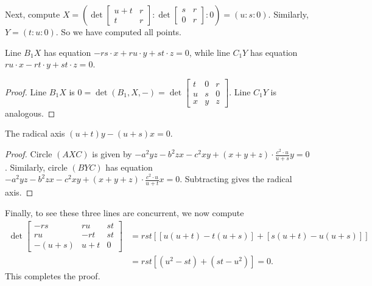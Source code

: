 Next, compute $X = \left(
  \det \left[ \begin{smallmatrix} u+t & r \\ t & r \end{smallmatrix} \right]
  : \det \left[ \begin{smallmatrix} s & r \\ 0 & r \end{smallmatrix} \right]
  : 0 \right) = (u : s : 0)$.
Similarly, $Y = (t : u : 0)$.
So we have computed all points.
\begin{claim*}
  Line $B_1X$ has equation
  $-rs \cdot x + ru \cdot y + st \cdot z = 0$,
  while line $C_1 Y$ has equation
  $ru \cdot x - rt \cdot y + st \cdot z = 0$.
\end{claim*}
\begin{proof}
  Line $B_1X$ is $0 = \det(B_1, X, -)
  = \det \left[ \begin{smallmatrix}
    t & 0 & r \\
    u & s & 0 \\
    x & y & z
\end{smallmatrix} \right]$.
  Line $C_1Y$ is analogous.
\end{proof}

\begin{claim*}
  The radical axis $(u+t) y - (u+s) x = 0$.
\end{claim*}
\begin{proof}
Circle $(AXC)$ is given by
$-a^2yz - b^2zx - c^2xy + (x+y+z) \cdot \frac{c^2 \cdot u}{u+s} y = 0$.
Similarly, circle $(BYC)$ has equation
$-a^2yz - b^2zx - c^2xy + (x+y+z) \cdot \frac{c^2 \cdot u}{u+t} x = 0$.
Subtracting gives the radical axis.
\end{proof}

Finally, to see these three lines are concurrent, we now compute
\begin{align*}
  \det \begin{bmatrix}
    -rs & ru & st \\
    ru & -rt & st \\
    -(u+s) & u+t & 0
  \end{bmatrix}
  &= rst \left[ [u(u+t)-t(u+s)] + [s(u+t)-u(u+s)] \right] \\
  &= rst \left[ (u^2-st) + (st-u^2) \right] = 0.
\end{align*}
This completes the proof.

